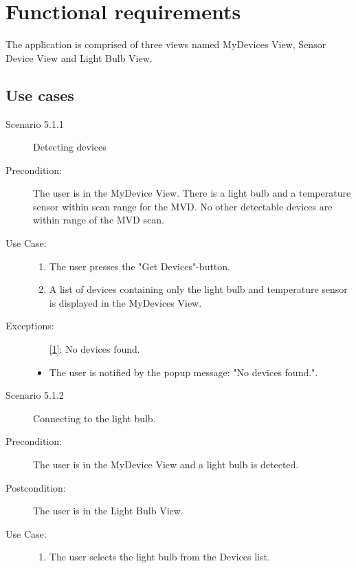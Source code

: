 \documentclass[a4paper]{article}
\begin{document}
\section{Functional requirements}

The application is comprised of three views named MyDevices View, Sensor Device View and Light Bulb View. 

\subsection{Use cases}
\begin{description}
\item[Scenario 5.1.1] Detecting devices
\item[Precondition:] The user is in the MyDevice View. There is a light bulb and a temperature sensor within scan range for the MVD. No other detectable devices are within range of the MVD scan.
\item[Use Case:]\mbox{}
\begin{enumerate}
\item The user presses the "Get Devices"-button.
\item \label{1} A list of devices containing only the light bulb and temperature sensor is displayed in the MyDevices View.
\end{enumerate}

\item[Exceptions:]
\item[]
\begin{itemize}
\item [\ref{1}:] No devices found.
\item The user is notified by the popup message: "No devices found.".
\end{itemize}

\item[]

\item[Scenario 5.1.2] Connecting to the light bulb.
\item[Precondition:] The user is in the MyDevice View and a light bulb is detected.
\item[Postcondition:] The user is in the Light Bulb View.
\item[Use Case:]\mbox{}
\begin{enumerate}
\item  The user selects the light bulb from the Devices list.
\end{enumerate}

\item[]


\end{description}
\end{document}
